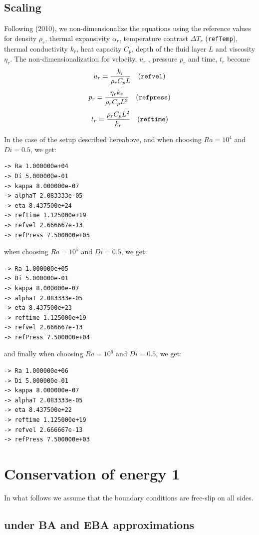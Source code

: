 \subsection*{Scaling}

Following \textcite{kilv10} (2010), we non-dimensionalize the equations using the reference values
for density $\rho_r$, thermal expansivity $\alpha_r$, 
temperature contrast $\Delta T_r$ ({\tt refTemp}),
thermal conductivity $k_r$, heat capacity $C_p$,  
depth of the fluid layer $L$ and viscosity $\eta_r$. The
non-dimensionalization for velocity, $u_r$ , pressure $p_r$ and time, $t_r$ become
\[
u_r = \frac{k_r}{\rho_r C_p L} \quad ({\tt refvel})
\]
\[
p_r=\frac{\eta_r k_r}{\rho_r C_p L^2}\quad  ({\tt refpress})
\]
\[
t_r=\frac{\rho_r C_p L^2}{k_r} \quad ({\tt reftime})
\]

In the case of the setup described hereabove, and 
when choosing $Ra=10^4$ and $Di=0.5$, we get:
\begin{verbatim}
-> Ra 1.000000e+04 
-> Di 5.000000e-01 
-> kappa 8.000000e-07 
-> alphaT 2.083333e-05 
-> eta 8.437500e+24 
-> reftime 1.125000e+19 
-> refvel 2.666667e-13 
-> refPress 7.500000e+05 
\end{verbatim}
when choosing $Ra=10^5$ and $Di=0.5$, we get:
\begin{verbatim}
-> Ra 1.000000e+05 
-> Di 5.000000e-01 
-> kappa 8.000000e-07 
-> alphaT 2.083333e-05 
-> eta 8.437500e+23 
-> reftime 1.125000e+19 
-> refvel 2.666667e-13 
-> refPress 7.500000e+04 
\end{verbatim}
and finally when choosing $Ra=10^6$ and $Di=0.5$, we get:
\begin{verbatim}
-> Ra 1.000000e+06 
-> Di 5.000000e-01 
-> kappa 8.000000e-07 
-> alphaT 2.083333e-05 
-> eta 8.437500e+22 
-> reftime 1.125000e+19 
-> refvel 2.666667e-13 
-> refPress 7.500000e+03
\end{verbatim}



\newpage
\section*{Conservation of energy 1}

In what follows we assume that the boundary conditions are free-slip 
on all sides.

\subsection*{under BA and EBA approximations}

